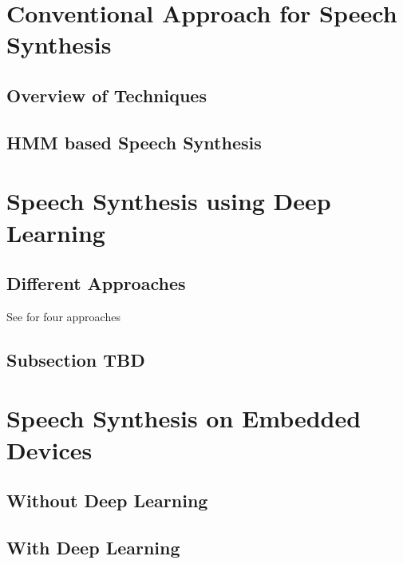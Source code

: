 

\section{Conventional Approach for Speech Synthesis}

\subsection{Overview of Techniques}

\blindtext

\subsection{HMM based Speech Synthesis}

\blindtext

\section{Speech Synthesis using Deep Learning}

\subsection{Different Approaches}

See \cite[page 20]{li:survey} for four approaches

\vspace{1em}

\blindtext

\subsection{Subsection TBD}

\blindtext

\section{Speech Synthesis on Embedded Devices}

\subsection{Without Deep Learning}

\blindtext

\subsection{With Deep Learning}

\blindtext

\clearpage